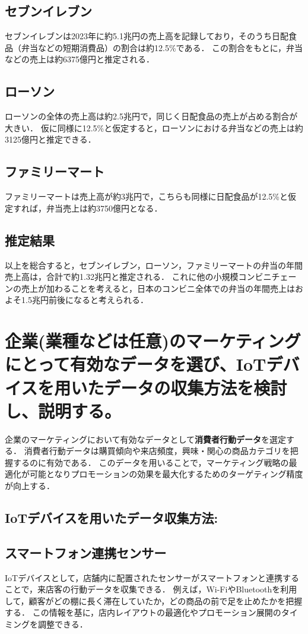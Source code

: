 \documentclass[titlepage,a4paper]{jsarticle}
\begin{document}
\subsection{セブンイレブン}
セブンイレブンは2023年に約5.1兆円の売上高を記録しており，そのうち日配食品（弁当などの短期消費品）の割合は約12.5\%である\cite{711}．
この割合をもとに，弁当などの売上は約6375億円と推定される．

\subsection{ローソン}
ローソンの全体の売上高は約2.5兆円で，同じく日配食品の売上が占める割合が大きい．
仮に同様に12.5\%と仮定すると，ローソンにおける弁当などの売上は約3125億円と推定できる\cite{Lowson}．

\subsection{ファミリーマート}
ファミリーマートは売上高が約3兆円で，こちらも同様に日配食品が12.5\%と仮定すれば，弁当売上は約3750億円となる\cite{fam}．

\subsection{推定結果}
以上を総合すると，セブンイレブン，ローソン，ファミリーマートの弁当の年間売上高は，合計で約1.32兆円と推定される．
これに他の小規模コンビニチェーンの売上が加わることを考えると，日本のコンビニ全体での弁当の年間売上はおよそ1.5兆円前後になると考えられる．

\section{企業(業種などは任意)のマーケティングにとって有効なデータを選び、IoTデバイスを用いたデータの収集方法を検討し、説明する。}
企業のマーケティングにおいて有効なデータとして\textbf{消費者行動データ}を選定する．
消費者行動データは購買傾向や来店頻度，興味・関心の商品カテゴリを把握するのに有効である．
このデータを用いることで，マーケティング戦略の最適化が可能となりプロモーションの効果を最大化するためのターゲティング精度が向上する．

\subsection*{IoTデバイスを用いたデータ収集方法:}
\subsection{スマートフォン連携センサー}
IoTデバイスとして，店舗内に配置されたセンサーがスマートフォンと連携することで，来店客の行動データを収集できる．
例えば，Wi-FiやBluetoothを利用して，顧客がどの棚に長く滞在していたか，どの商品の前で足を止めたかを把握する．
この情報を基に，店内レイアウトの最適化やプロモーション展開のタイミングを調整できる．
\end{document}
